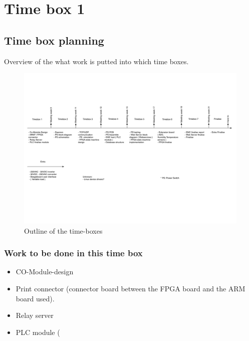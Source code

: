 \section{Time box 1}
\subsection{Time box planning}
Overview of the what work is putted into which time boxes.
\begin{figure}[H]
	\begin{centering}
		 \includegraphics[width=1.0\textwidth]{images/tb_r1.pdf}
		\caption{Outline of the time-boxes}
	\end{centering}
\end{figure}

\subsubsection{Work to be done in this time box}
\begin{itemize}
	\item CO-Module-design
	\item Print connector (connector board between the FPGA board and the ARM board used).
	\item Relay server
	\item PLC module (
\end{itemize}

